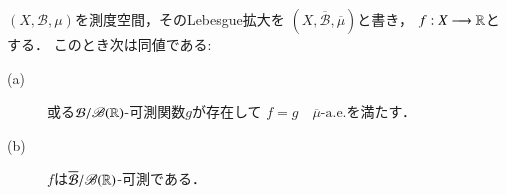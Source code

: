 		\begin{screen}
			\begin{thm}[拡大前後の可測性]\label{thm:measurability_before_after_Lebesgue_extension}
				$(X,\mathcal{B},\mu)$を測度空間，そのLebesgue拡大を
				$\left(X,\overline{\mathcal{B}},\overline{\mu}\right)$と書き，
				$f:X \longrightarrow \mathbb{R}$とする．
				このとき次は同値である:
				\begin{description}
					\item[(a)] 或る$\mathcal{B}/\mathscr{B}(\mathbb{R})$-可測関数$g$が存在して
						$f = g\quad \mbox{$\overline{\mu}$-a.e.}$を満たす．
					\item[(b)] $f$は$\overline{\mathcal{B}}/\mathscr{B}(\mathbb{R})$-可測である．
				\end{description}
			\end{thm}
		\end{screen}
		
